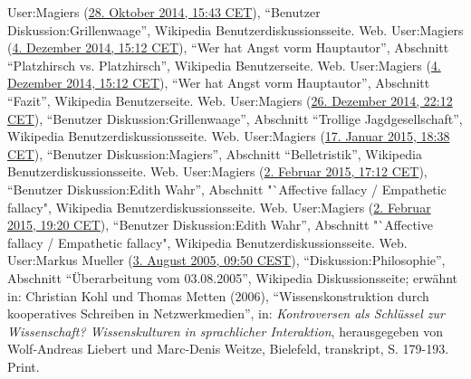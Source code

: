 \documentclass[fontsize=12pt]{scrartcl}
\begin{document}
{{{{\begin{thebibliography}
	User:Magiers (\href{https://de.wikipedia.org/w/index.php?title=Benutzer_Diskussion:Grillenwaage\&diff=135299468\&oldid=135298878}{28. Oktober 2014, 15:43 CET}), "`Be\-nut\-zer Dis\-kus\-si\-on:Gril\-len\-waage"', Wi\-ki\-pe\-dia Be\-nut\-zer\-dis\-kus\-sions\-seite. Web.
	User:Magiers (\href{https://de.wikipedia.org/w/index.php?title=Benutzer:Magiers/Wer\_hat\_Angst\_vorm\_Hauptautor\%3F\&oldid=136460924\#Platzhirsch_vs._Platzhirsch}{4. Dezember 2014, 15:12 CET}), "`Wer hat Angst vorm Hauptautor"', Abschnitt "`Platzhirsch vs. Platzhirsch"', Wi\-ki\-pe\-dia Be\-nut\-zerseite. Web.
	User:Magiers (\href{https://de.wikipedia.org/w/index.php?title=Benutzer:Magiers/Wer\_hat\_Angst\_vorm\_Hauptautor\%3F\&oldid=136460924\#Fazit}{4. Dezember 2014, 15:12 CET}), "`Wer hat Angst vorm Hauptautor"', Abschnitt "`Fazit"', Wi\-ki\-pe\-dia Be\-nut\-zerseite. Web.
	User:Magiers (\href{https://de.wikipedia.org/w/index.php?title=Benutzer_Diskussion:Grillenwaage\&diff=prev\&oldid=137132932}{26. Dezember 2014, 22:12 CET}), "`Be\-nut\-zer Dis\-kus\-si\-on:Grillenwaage"', Abschnitt "`Trollige Jagdge\-sell\-schaft"', Wi\-ki\-pe\-dia Be\-nut\-zerdis\-kus\-si\-onsseite. Web.
	User:Magiers (\href{https://de.wikipedia.org/w/index.php?title=Benutzer_Diskussion:Magiers\&diff=next\&oldid=137874796}{17. Januar 2015, 18:38 CET}), "`Be\-nut\-zer Dis\-kus\-si\-on:Magiers"', Abschnitt "`Belletristik"', Wi\-ki\-pe\-dia Be\-nut\-zerdis\-kus\-si\-onsseite. Web.
	User:Magiers (\href{https://de.wikipedia.org/w/index.php?title=Benutzer_Diskussion:Edith_Wahr\&diff=prev\&oldid=138424233}{2. Februar 2015, 17:12 CET}), "`Be\-nut\-zer Dis\-kus\-si\-on:Edith Wahr"', Abschnitt "`Affective fallacy / Empathetic fallacy", Wi\-ki\-pe\-dia Be\-nut\-zerdis\-kus\-si\-onsseite. Web.
	User:Magiers (\href{https://de.wikipedia.org/w/index.php?title=Benutzer_Diskussion:Edith_Wahr\&diff=138430132\&oldid=138428015}{2. Februar 2015, 19:20 CET}), "`Be\-nut\-zer Dis\-kus\-si\-on:Edith Wahr"', Abschnitt "`Affective fallacy / Empathetic fallacy", Wi\-ki\-pe\-dia Be\-nut\-zerdis\-kus\-si\-onsseite. Web.
	User:Markus Mueller (\href{https://de.wikipedia.org/w/index.php?title=Diskussion:Philosophie\&diff=next\&oldid=7928221}{3. August 2005, 09:50 CEST}), "`Dis\-kus\-si\-on:Philosophie"', Abschnitt "`\"Uberarbeitung vom 03.08.2005"', Wikipedia Dis\-kus\-si\-onssei\-te; erw\"ahnt in: Christi\-an Kohl und Tho\-mas Metten (2006), "`Wissenskonstruktion durch kooperatives Schrei\-ben in Netz\-werk\-medien"', in: \textit{Kontroversen als Schl\"ussel zur Wissenschaft? Wissenskulturen in sprachlicher Interaktion}, he\-rausgegeben von Wolf-Andreas Liebert und Marc-Denis Weitze, Bielefeld, transkript, S. 179-193. Print.

\end{thebibliography}}}}}
\end{document}

